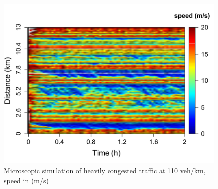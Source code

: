 \documentclass[procedia]{easychair}
\begin{document}
 \begin{figure}[!htbp]
      \centering
          \includegraphics[clip=true,trim=0cm 0cm 0cm 1.5cm,scale=0.39]{graphs/Simulated/Heavy-Traffic}
      	\caption{Microscopic simulation of heavily congested traffic at 110 veh/km, speed in (m/s)}
      	 \label{fig:heavy-traffic}
   \end{figure}
   
\end{document}
